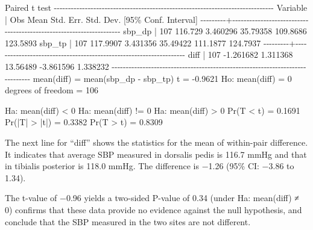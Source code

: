 \documentclass[
]{memoir}
\newenvironment{Shaded}{\begin{snugshade}}{\end{snugshade}}
\newcommand{\NormalTok}[1]{#1}
\begin{document}
\begin{Shaded}
\begin{Highlighting}[]
\NormalTok{Paired t test}
\NormalTok{{-}{-}{-}{-}{-}{-}{-}{-}{-}{-}{-}{-}{-}{-}{-}{-}{-}{-}{-}{-}{-}{-}{-}{-}{-}{-}{-}{-}{-}{-}{-}{-}{-}{-}{-}{-}{-}{-}{-}{-}{-}{-}{-}{-}{-}{-}{-}{-}{-}{-}{-}{-}{-}{-}{-}{-}{-}{-}{-}{-}{-}{-}{-}{-}{-}{-}{-}{-}{-}{-}{-}{-}{-}{-}{-}{-}{-}{-}}
\NormalTok{Variable |     Obs        Mean    Std. Err.   Std. Dev.   [95\% Conf. Interval]}
\NormalTok{{-}{-}{-}{-}{-}{-}{-}{-}{-}+{-}{-}{-}{-}{-}{-}{-}{-}{-}{-}{-}{-}{-}{-}{-}{-}{-}{-}{-}{-}{-}{-}{-}{-}{-}{-}{-}{-}{-}{-}{-}{-}{-}{-}{-}{-}{-}{-}{-}{-}{-}{-}{-}{-}{-}{-}{-}{-}{-}{-}{-}{-}{-}{-}{-}{-}{-}{-}{-}{-}{-}{-}{-}{-}{-}{-}{-}{-}}
\NormalTok{  sbp\_dp |     107     116.729    3.460296    35.79358    109.8686    123.5893}
\NormalTok{  sbp\_tp |     107    117.9907    3.431356    35.49422    111.1877    124.7937}
\NormalTok{{-}{-}{-}{-}{-}{-}{-}{-}{-}+{-}{-}{-}{-}{-}{-}{-}{-}{-}{-}{-}{-}{-}{-}{-}{-}{-}{-}{-}{-}{-}{-}{-}{-}{-}{-}{-}{-}{-}{-}{-}{-}{-}{-}{-}{-}{-}{-}{-}{-}{-}{-}{-}{-}{-}{-}{-}{-}{-}{-}{-}{-}{-}{-}{-}{-}{-}{-}{-}{-}{-}{-}{-}{-}{-}{-}{-}{-}}
\NormalTok{    diff |     107   {-}1.261682    1.311368    13.56489   {-}3.861596    1.338232}
\NormalTok{{-}{-}{-}{-}{-}{-}{-}{-}{-}{-}{-}{-}{-}{-}{-}{-}{-}{-}{-}{-}{-}{-}{-}{-}{-}{-}{-}{-}{-}{-}{-}{-}{-}{-}{-}{-}{-}{-}{-}{-}{-}{-}{-}{-}{-}{-}{-}{-}{-}{-}{-}{-}{-}{-}{-}{-}{-}{-}{-}{-}{-}{-}{-}{-}{-}{-}{-}{-}{-}{-}{-}{-}{-}{-}{-}{-}{-}{-}}
\NormalTok{     mean(diff) = mean(sbp\_dp {-} sbp\_tp)                           t =  {-}0.9621}
\NormalTok{ Ho: mean(diff) = 0                              degrees of freedom =      106}

\NormalTok{ Ha: mean(diff) \textless{} 0           Ha: mean(diff) != 0           Ha: mean(diff) \textgreater{} 0}
\NormalTok{ Pr(T \textless{} t) = 0.1691         Pr(|T| \textgreater{} |t|) = 0.3382          Pr(T \textgreater{} t) = 0.8309}
\end{Highlighting}
\end{Shaded}

The next line for ``diff'' shows the statistics for the mean of within-pair difference. It indicates that average SBP measured in dorsalis pedis is 116.7 mmHg and that in tibialis posterior is 118.0 mmHg. The difference is −1.26 (95\% CI: −3.86 to 1.34).

The t-value of −0.96 yields a two-sided P-value of 0.34 (under Ha: mean(diff) ≠ 0) confirms that these data provide no evidence against the null hypothesis, and conclude that the SBP measured in the two sites are not different.
\end{document}
